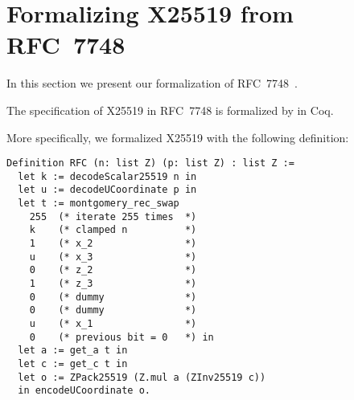 \section{Formalizing X25519 from RFC~7748}
\label{sec:Coq-RFC}

In this section we present our formalization of RFC~7748~\cite{rfc7748}.

\begin{informaltheorem}
The specification of X25519 in RFC~7748 is formalized by  in Coq.
\end{informaltheorem}

More specifically, we formalized X25519 with the following definition:
\begin{lstlisting}[language=Coq]
Definition RFC (n: list Z) (p: list Z) : list Z :=
  let k := decodeScalar25519 n in
  let u := decodeUCoordinate p in
  let t := montgomery_rec_swap
    255  (* iterate 255 times  *)
    k    (* clamped n          *)
    1    (* x_2                *)
    u    (* x_3                *)
    0    (* z_2                *)
    1    (* z_3                *)
    0    (* dummy              *)
    0    (* dummy              *)
    u    (* x_1                *)
    0    (* previous bit = 0   *) in
  let a := get_a t in
  let c := get_c t in
  let o := ZPack25519 (Z.mul a (ZInv25519 c))
  in encodeUCoordinate o.
\end{lstlisting}

